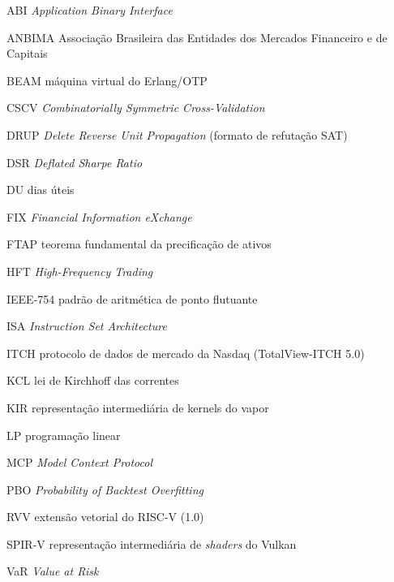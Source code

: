 \documentclass[
  12pt, openany, oneside, a4paper,
  chapter=TITLE, section=TITLE,
  english, brazil
]{abntex2}
\newcommand{\vapor}{\textsf{vapor}}
\begin{document}
\listoffigures*
\cleardoublepage
{}
\listoftables*
\cleardoublepage

\begin{siglas}
  \item[ABI] \textit{Application Binary Interface}
  \item[ANBIMA] Associação Brasileira das Entidades dos Mercados Financeiro e de Capitais
  \item[BEAM] máquina virtual do Erlang/OTP
  \item[CSCV] \textit{Combinatorially Symmetric Cross-Validation}
  \item[DRUP] \textit{Delete Reverse Unit Propagation} (formato de refutação SAT)
  \item[DSR] \textit{Deflated Sharpe Ratio}
  \item[DU] dias úteis
  \item[FIX] \textit{Financial Information eXchange}
  \item[FTAP] teorema fundamental da precificação de ativos
  \item[HFT] \textit{High-Frequency Trading}
  \item[IEEE-754] padrão de aritmética de ponto flutuante
  \item[ISA] \textit{Instruction Set Architecture}
  \item[ITCH] protocolo de dados de mercado da Nasdaq (TotalView-ITCH 5.0)
  \item[KCL] lei de Kirchhoff das correntes
  \item[KIR] representação intermediária de kernels do \vapor
  \item[LP] programação linear
  \item[MCP] \textit{Model Context Protocol}
  \item[PBO] \textit{Probability of Backtest Overfitting}
  \item[RVV] extensão vetorial do RISC-V (1.0)
  \item[SPIR-V] representação intermediária de \textit{shaders} do Vulkan
  \item[VaR] \textit{Value at Risk}
\end{siglas}

\tableofcontents*
\cleardoublepage

\textual










\postextual


\begin{apendicesenv}
\partapendices



\end{apendicesenv}

\printindex
\end{document}
